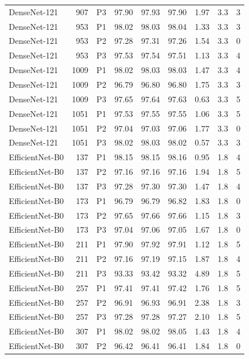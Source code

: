{\begin{longtable}{lrlrrrrrr}
DenseNet-121 & 907 & P3 & 97.90 & 97.93 & 97.90 & 1.97 & 3.3 & 3 \\
DenseNet-121 & 953 & P1 & 98.02 & 98.03 & 98.04 & 1.33 & 3.3 & 3 \\
DenseNet-121 & 953 & P2 & 97.28 & 97.31 & 97.26 & 1.54 & 3.3 & 0 \\
DenseNet-121 & 953 & P3 & 97.53 & 97.54 & 97.51 & 1.13 & 3.3 & 4 \\
DenseNet-121 & 1009 & P1 & 98.02 & 98.03 & 98.03 & 1.47 & 3.3 & 4 \\
DenseNet-121 & 1009 & P2 & 96.79 & 96.80 & 96.80 & 1.75 & 3.3 & 3 \\
DenseNet-121 & 1009 & P3 & 97.65 & 97.64 & 97.63 & 0.63 & 3.3 & 5 \\
DenseNet-121 & 1051 & P1 & 97.53 & 97.55 & 97.55 & 1.06 & 3.3 & 5 \\
DenseNet-121 & 1051 & P2 & 97.04 & 97.03 & 97.06 & 1.77 & 3.3 & 0 \\
DenseNet-121 & 1051 & P3 & 98.02 & 98.03 & 98.02 & 0.57 & 3.3 & 3 \\
EfficientNet-B0 & 137 & P1 & 98.15 & 98.15 & 98.16 & 0.95 & 1.8 & 4 \\
EfficientNet-B0 & 137 & P2 & 97.16 & 97.16 & 97.16 & 1.94 & 1.8 & 5 \\
EfficientNet-B0 & 137 & P3 & 97.28 & 97.30 & 97.30 & 1.47 & 1.8 & 4 \\
EfficientNet-B0 & 173 & P1 & 96.79 & 96.79 & 96.82 & 1.83 & 1.8 & 0 \\
EfficientNet-B0 & 173 & P2 & 97.65 & 97.66 & 97.66 & 1.15 & 1.8 & 3 \\
EfficientNet-B0 & 173 & P3 & 97.04 & 97.06 & 97.05 & 1.67 & 1.8 & 0 \\
EfficientNet-B0 & 211 & P1 & 97.90 & 97.92 & 97.91 & 1.12 & 1.8 & 5 \\
EfficientNet-B0 & 211 & P2 & 97.16 & 97.19 & 97.15 & 1.87 & 1.8 & 4 \\
EfficientNet-B0 & 211 & P3 & 93.33 & 93.42 & 93.32 & 4.89 & 1.8 & 5 \\
EfficientNet-B0 & 257 & P1 & 97.41 & 97.41 & 97.42 & 1.76 & 1.8 & 5 \\
EfficientNet-B0 & 257 & P2 & 96.91 & 96.93 & 96.91 & 2.38 & 1.8 & 3 \\
EfficientNet-B0 & 257 & P3 & 97.28 & 97.28 & 97.27 & 2.10 & 1.8 & 5 \\
EfficientNet-B0 & 307 & P1 & 98.02 & 98.02 & 98.05 & 1.43 & 1.8 & 4 \\
EfficientNet-B0 & 307 & P2 & 96.42 & 96.41 & 96.41 & 1.84 & 1.8 & 0 \\

\end{longtable}}
